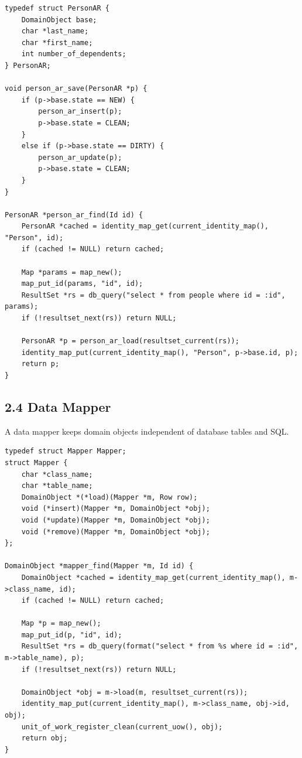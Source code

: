 \documentclass[11pt]{article}
\begin{document}
\begin{verbatim}
typedef struct PersonAR {
    DomainObject base;
    char *last_name;
    char *first_name;
    int number_of_dependents;
} PersonAR;

void person_ar_save(PersonAR *p) {
    if (p->base.state == NEW) {
        person_ar_insert(p);
        p->base.state = CLEAN;
    }
    else if (p->base.state == DIRTY) {
        person_ar_update(p);
        p->base.state = CLEAN;
    }
}

PersonAR *person_ar_find(Id id) {
    PersonAR *cached = identity_map_get(current_identity_map(), "Person", id);
    if (cached != NULL) return cached;

    Map *params = map_new();
    map_put_id(params, "id", id);
    ResultSet *rs = db_query("select * from people where id = :id", params);
    if (!resultset_next(rs)) return NULL;

    PersonAR *p = person_ar_load(resultset_current(rs));
    identity_map_put(current_identity_map(), "Person", p->base.id, p);
    return p;
}
\end{verbatim}

\subsection{2.4 Data Mapper}\label{data-mapper}

A data mapper keeps domain objects independent of database tables and
SQL.

\begin{verbatim}
typedef struct Mapper Mapper;
struct Mapper {
    char *class_name;
    char *table_name;
    DomainObject *(*load)(Mapper *m, Row row);
    void (*insert)(Mapper *m, DomainObject *obj);
    void (*update)(Mapper *m, DomainObject *obj);
    void (*remove)(Mapper *m, DomainObject *obj);
};

DomainObject *mapper_find(Mapper *m, Id id) {
    DomainObject *cached = identity_map_get(current_identity_map(), m->class_name, id);
    if (cached != NULL) return cached;

    Map *p = map_new();
    map_put_id(p, "id", id);
    ResultSet *rs = db_query(format("select * from %s where id = :id", m->table_name), p);
    if (!resultset_next(rs)) return NULL;

    DomainObject *obj = m->load(m, resultset_current(rs));
    identity_map_put(current_identity_map(), m->class_name, obj->id, obj);
    unit_of_work_register_clean(current_uow(), obj);
    return obj;
}
\end{verbatim}
\end{document}
